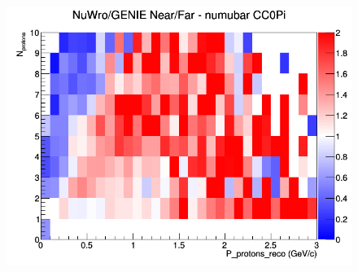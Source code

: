 \begin{figure}[h]
\endminipage
{}
\includegraphics[width=\linewidth]{eff_N_P/GAr/protons/ratios/CC0Pi_NuWro_GENIE_numubar_NF_N_P.png}
\endminipage
\newline
\end{figure}
\clearpage
